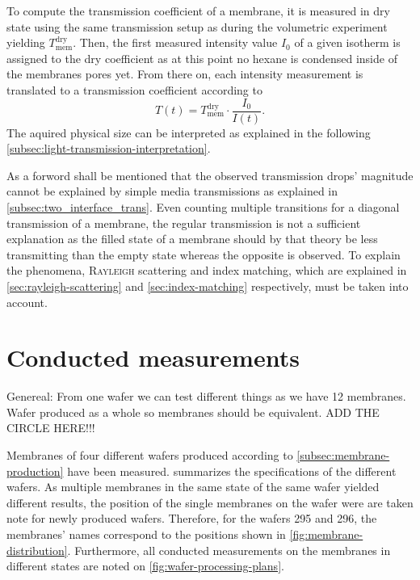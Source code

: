 \documentclass[../thesis.tex]{subfiles}
\begin{document}
          To compute the transmission coefficient of a membrane, it is measured in dry state using the same transmission setup as during the volumetric experiment yielding $T_\mathrm{mem}^\mathrm{dry}$. Then, the first measured intensity value $I_0$ of a given isotherm is assigned to the dry coefficient as at this point no hexane is condensed inside of the membranes pores yet. From there on, each intensity measurement is translated to a transmission coefficient according to
          \begin{equation}
              T(t) = T_\mathrm{mem}^\mathrm{dry} \cdot \frac{I_0}{I(t)}.
          \end{equation}
          The aquired physical size can be interpreted as explained in the following  \cref{subsec:light-transmission-interpretation}.

          As a forword shall be mentioned that the observed transmission drops' magnitude cannot be explained by simple media transmissions as explained in \cref{subsec:two_interface_trans}. Even counting multiple transitions for a diagonal transmission of a membrane, the regular transmission is not a sufficient explanation as the filled state of a membrane should by that theory be less transmitting than the empty state whereas the opposite is observed. To explain the phenomena, \textsc{Rayleigh} scattering and index matching, which are explained in \cref{sec:rayleigh-scattering} and \cref{sec:index-matching} respectively, must be taken into account.


      \section{Conducted measurements}
      \label{sec:conducted-measurements}

        

        Genereal: From one wafer we can test different things as we have 12 membranes. Wafer produced as a whole so membranes should be equivalent. ADD THE CIRCLE HERE!!!
        \medskip

        Membranes of four different wafers produced according to \cref{subsec:membrane-production} have been measured.  summarizes the specifications of the different wafers. As multiple membranes in the same state of the same wafer yielded different results, the position of the single membranes on the wafer were are taken note for newly produced wafers. Therefore, for the wafers 295 and 296, the membranes' names correspond to the positions shown in \cref{fig:membrane-distribution}. Furthermore, all conducted measurements on the membranes in different states are noted on \cref{fig:wafer-processing-plans}.
\end{document}
